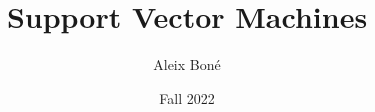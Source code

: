 




\renewcommand\and{\\[\baselineskip]}

\title{Support Vector Machines}
\author{Aleix Boné}
\date{Fall 2022}









\tableofcontents \pagebreak



\setlength{\parskip}{1em plus 0.5em minus 0.2em}

\setlength{\headheight}{14.5pt}
\pagestyle{fancy}


